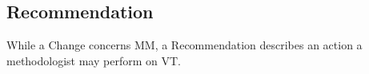 \subsection{Recommendation}
\label{sec:Suggestion:Recommendation}

While a \textsf{Change} concerns \textsf{MM}, a \textsf{Recommendation} describes
an action a methodologist may perform on \textsf{VT}. 
